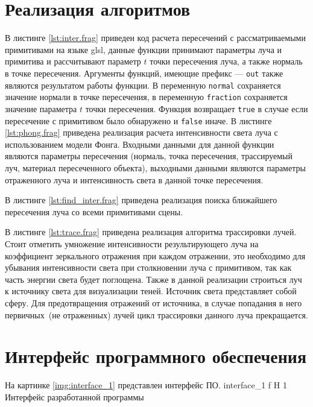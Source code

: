 \section{Реализация алгоритмов}
В листинге \ref{lst:inter.frag} приведен код расчета пересечений с рассматриваемыми примитивами на языке glsl, данные функции принимают
параметры луча и примитива  и рассчитывают параметр $t$ точки пересечения луча, а также нормаль   в точке пересечения.
Аргументы функций, имеющие префикс --- \texttt{out} также являются результатом работы функции.
В переменную \texttt{normal} сохраняется значение нормали в точке пересечения, в переменную \texttt{fraction} сохраняется 
значение параметра $t$ точки пересечения. Функция возвращает \texttt{true} в случае если пересечение с примитивом было обнаружено и \texttt{false}
иначе. 
В листинге \ref{lst:phong.frag} приведена реализация  расчета интенсивности света 
луча с использованием модели Фонга. Входными данными для данной функции являются параметры пересечения (нормаль, точка пересечения, трассируемый луч, 
материал пересеченного объекта), выходными данными являются параметры отраженного луча  и интенсивность света в данной точке пересечения.

В листинге \ref{lst:find_inter.frag} приведена реализация  поиска ближайшего пересечения луча со всеми  примитивами сцены.

В листинге \ref{lst:trace.frag}  приведена реализация алгоритма трассировки лучей. 
Стоит отметить умножение интенсивности результирующего луча на 
коэффициент зеркального отражения
при каждом отражении, это необходимо для убывания интенсивности света при  столкновении луча  с примитивом,
так как часть энергии света будет поглощена. Также в данной реализации строиться луч к источнику света для
визуализации теней. Источник света представляет собой сферу. Для предотвращения отражений от источника, в случае попадания в него первичных~(не отраженных)
лучей цикл трассировки данного луча прекращается.






\section{Интерфейс программного обеспечения}

На картинке \ref{img:interface_1} представлен интерфейс ПО.
{interface_1} %
{f} %
{H} %
{1\textwidth} %
{Интерфейс разработанной программы} %

